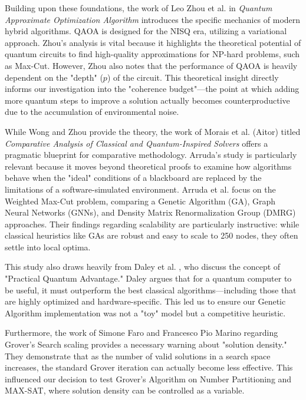 \documentclass[12pt]{article}
\begin{document}
Building upon these foundations, the work of Leo Zhou et al. in \textit{Quantum Approximate Optimization Algorithm} \cite{zhou2020} introduces the specific mechanics of modern hybrid algorithms. QAOA is designed for the NISQ era, utilizing a variational approach. Zhou’s analysis is vital because it highlights the theoretical potential of quantum circuits to find high-quality approximations for NP-hard problems, such as Max-Cut. However, Zhou also notes that the performance of QAOA is heavily dependent on the "depth" ($p$) of the circuit. This theoretical insight directly informs our investigation into the "coherence budget"—the point at which adding more quantum steps to improve a solution actually becomes counterproductive due to the accumulation of environmental noise.

While Wong and Zhou provide the theory, the work of Morais et al. (Aitor) \cite{aitor} titled \textit{Comparative Analysis of Classical and Quantum-Inspired Solvers} offers a pragmatic blueprint for comparative methodology. Arruda’s study is particularly relevant because it moves beyond theoretical proofs to examine how algorithms behave when the "ideal" conditions of a blackboard are replaced by the limitations of a software-simulated environment. Arruda et al. focus on the Weighted Max-Cut problem, comparing a Genetic Algorithm (GA), Graph Neural Networks (GNNs), and Density Matrix Renormalization Group (DMRG) approaches. Their findings regarding scalability are particularly instructive: while classical heuristics like GAs are robust and easy to scale to 250 nodes, they often settle into local optima.

This study also draws heavily from Daley et al. \cite{daley2022}, who discuss the concept of "Practical Quantum Advantage." Daley argues that for a quantum computer to be useful, it must outperform the best classical algorithms—including those that are highly optimized and hardware-specific. This led us to ensure our Genetic Algorithm implementation was not a "toy" model but a competitive heuristic.

Furthermore, the work of Simone Faro and Francesco Pio Marino \cite{faro} regarding Grover’s Search scaling provides a necessary warning about "solution density." They demonstrate that as the number of valid solutions in a search space increases, the standard Grover iteration can actually become less effective. This influenced our decision to test Grover’s Algorithm on Number Partitioning and MAX-SAT, where solution density can be controlled as a variable.
\end{document}
